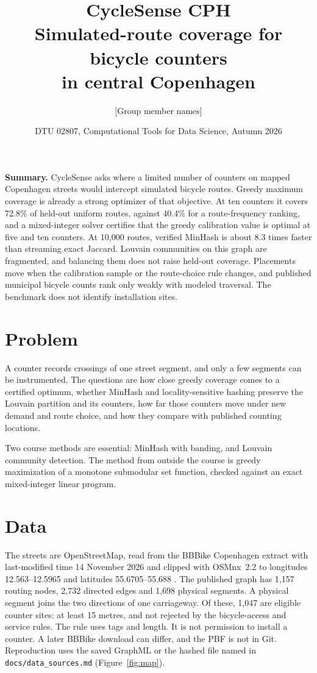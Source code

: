 \documentclass[11pt,a4paper]{article}
\title{\textbf{CycleSense CPH}\\[0.35em]
\large Simulated-route coverage for bicycle counters\\ in central Copenhagen}
\author{[Group member names]}
\date{DTU 02807, Computational Tools for Data Science, Autumn 2026}
\begin{document}
\maketitle
\vspace{-1.6em}

\textbf{Summary.}
CycleSense asks where a limited number of counters on mapped Copenhagen streets would intercept simulated bicycle routes. Greedy maximum coverage is already a strong optimizer of that objective. At ten counters it covers 72.8\% of held-out uniform routes, against 40.4\% for a route-frequency ranking, and a mixed-integer solver certifies that the greedy calibration value is optimal at five and ten counters. At 10{,}000 routes, verified MinHash is about 8.3 times faster than streaming exact Jaccard. Louvain communities on this graph are fragmented, and balancing them does not raise held-out coverage. Placements move when the calibration sample or the route-choice rule changes, and published municipal bicycle counts rank only weakly with modeled traversal. The benchmark does not identify installation sites.

\section{Problem}

A counter records crossings of one street segment, and only a few segments can be instrumented. The questions are how close greedy coverage comes to a certified optimum, whether MinHash and locality-sensitive hashing preserve the Louvain partition and its counters, how far those counters move under new demand and route choice, and how they compare with published counting locations.

Two course methods are essential: MinHash with banding, and Louvain community detection. The method from outside the course is greedy maximization of a monotone submodular set function, checked against an exact mixed-integer linear program.

\section{Data}

The streets are OpenStreetMap, read from the BBBike Copenhagen extract with last-modified time 14 November 2026 and clipped with OSMnx~2.2 to longitudes 12.563--12.5965 and latitudes 55.6705--55.688 \cite{osm,bbbike,boeing}. The published graph has 1{,}157 routing nodes, 2{,}732 directed edges and 1{,}698 physical segments. A physical segment joins the two directions of one carriageway. Of these, 1{,}047 are eligible counter sites: at least 15 metres, and not rejected by the bicycle-access and service rules. The rule uses tags and length. It is not permission to install a counter. A later BBBike download can differ, and the PBF is not in Git. Reproduction uses the saved GraphML or the hashed file named in \texttt{docs/data\_sources.md} (Figure~\ref{fig:map}).
\end{document}
